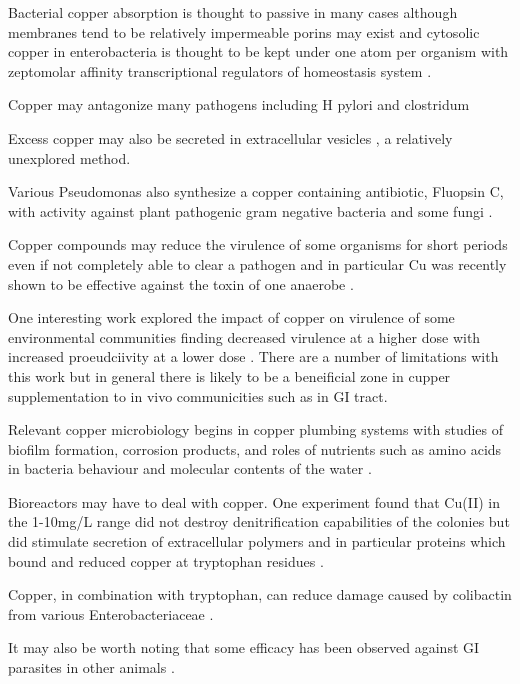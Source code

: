 {Bacterial copper absorption is thought to passive in many cases
although membranes tend to be relatively impermeable porins
may exist and cytosolic copper in enterobacteria is thought to
be kept under one atom per organism with zeptomolar affinity
transcriptional regulators of homeostasis system
\cite{Giachino_Waldron_Copper_tolerance_bacteria_2020}.


Copper may antagonize many pathogens including
H pylori
\cite{Bernegger_Brunner_VizoviUx0161badcharvv353ek_novel_FRET_peptide_2020}
and clostridum


Excess copper may also be secreted in extracellular vesicles
\cite{Lima_MatinhaCardoso_GinerLamia_Extracellular_vesicles_2022},
a relatively unexplored method.

Various Pseudomonas also synthesize a copper containing antibiotic,
Fluopsin C, with activity against plant pathogenic 
 gram negative bacteria and some fungi 
\cite{Afonso_deLimaAndreata_Chryssafidis_Fluopsin_Review_2022}.

Copper compounds may reduce the virulence of some  organisms for short periods
even if not completely able to clear a pathogen\cite{PMC4542191}
and in particular Cu was recently shown to be effective against
the toxin of one anaerobe  \cite{doi:10.1021/jacs.7b01084} .

One interesting work explored the impact of copper on virulence
of some environmental communities finding decreased virulence
at a higher dose with increased proeudciivity at a lower dose
\cite{Lear_Padfield_Hesse_Copper_reduces_virulence_2023}. 
There are a number of limitations with this work but in general
there is likely to be a beneificial zone in cupper supplementation
to in vivo communicities such as in GI tract. 


Relevant copper microbiology begins in copper plumbing
systems with studies of biofilm formation, corrosion products,
and roles of nutrients such as amino acids in bacteria
behaviour and molecular contents of the water
\cite{Hu_Wang_Shao_Enhanced_formation_carbonaceous_2020}.

Bioreactors may have to deal with copper. One experiment
found that Cu(II) in the 1-10mg/L range did not destroy
denitrification capabilities of the colonies but did
stimulate secretion of extracellular polymers and in particular
proteins which bound and reduced copper at tryptophan residues
\cite{PMID35288132}.

Copper, in combination with tryptophan, can reduce damage
caused by colibactin from various Enterobacteriaceae
\cite{JeffreyLawrenceBlanchard_tryptophan_copper_2024}.

It may also be worth noting that some efficacy has been observed
against GI parasites in other animals 
\cite{RibeiroDolenga_Anjos_Arruda_Copper_chloride_copper_2023}
\cite{Needleman_Wright_Schaefer_Copper_oxide_wire_particles_2022}
.

} %
